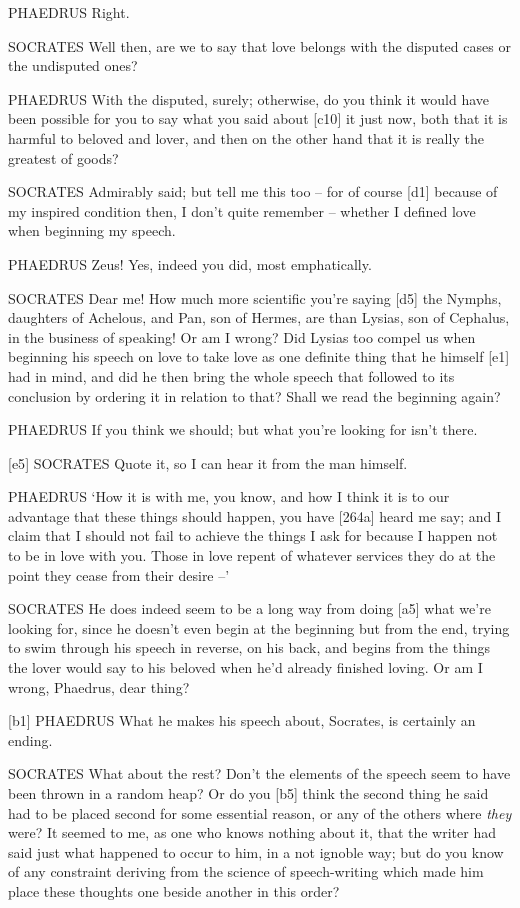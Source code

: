 PHAEDRUS Right.

SOCRATES Well then, are we to say that love belongs with the disputed
cases or the undisputed ones?

PHAEDRUS With the disputed, surely; otherwise, do you think it would
have been possible for you to say what you said about {[}c10{]} it just
now, both that it is harmful to beloved and lover, and then on the other
hand that it is really the greatest of goods?

SOCRATES Admirably said; but tell me this too -- for of course {[}d1{]}
because of my inspired condition then, I don't quite remember -- whether
I defined love when beginning my speech.

PHAEDRUS Zeus! Yes, indeed you did, most emphatically.

SOCRATES Dear me! How much more scientific you're saying {[}d5{]} the
Nymphs, daughters of Achelous, and Pan, son of Hermes, are than Lysias,
son of Cephalus, in the business of speaking! Or am I wrong? Did Lysias
too compel us when beginning his speech on love to take love as one
definite thing that he himself {[}e1{]} had in mind, and did he then
bring the whole speech that followed to its conclusion by ordering it in
relation to that? Shall we read the beginning again?

PHAEDRUS If you think we should; but what you're looking for isn't
there.

{[}e5{]} SOCRATES Quote it, so I can hear it from the man himself.

PHAEDRUS ‘How it is with me, you know, and how I think it is to our
advantage that these things should happen, you have {[}264a{]} heard me
say; and I claim that I should not fail to achieve the things I ask for
because I happen not to be in love with you. Those in love repent of
whatever services they do at the point they cease from their desire --'

SOCRATES He does indeed seem to be a long way from doing {[}a5{]} what
we're looking for, since he doesn't even begin at the beginning but from
the end, trying to swim through his speech in reverse, on his back, and
begins from the things the lover would say to his beloved when he'd
already finished loving. Or am I wrong, Phaedrus, dear
thing?

{[}b1{]} PHAEDRUS What he makes his speech about, Socrates, is certainly
an ending.

SOCRATES What about the rest? Don't the elements of the speech seem to
have been thrown in a random heap? Or do you {[}b5{]} think the second
thing he said had to be placed second for some essential reason, or any
of the others where {\em they} were? It seemed to me, as one who knows
nothing about it, that the writer had said just what happened to occur
to him, in a not ignoble way; but do you know of any constraint deriving
from the science of speech-writing which made him place these thoughts
one beside another in this order?

